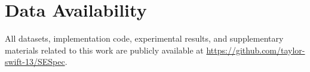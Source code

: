 \documentclass[lettersize,journal]{IEEEtran}
\begin{document}
\section*{Data Availability}
All datasets, implementation code, experimental results, and supplementary materials related to this work are publicly available at \url{https://github.com/taylor-swift-13/SESpec}.





\clearpage
\appendices
\raggedbottom











\end{document}
